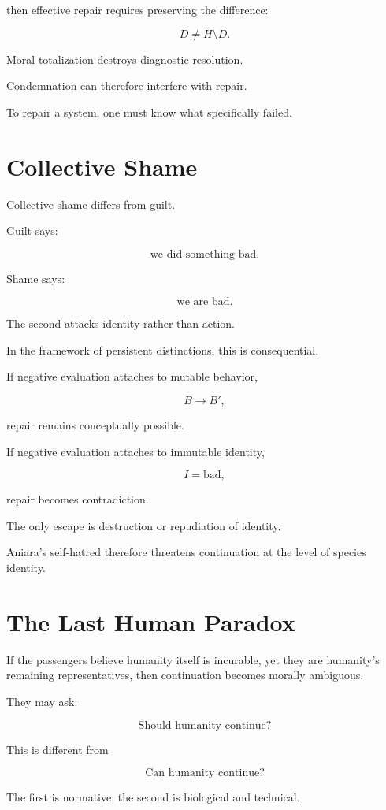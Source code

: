 \documentclass[11pt,oneside]{book}
\theoremstyle{definition}
\theoremstyle{remark}
\begin{document}
then effective repair requires preserving the difference:

\[
D\neq H\setminus D.
\]

Moral totalization destroys diagnostic resolution.

Condemnation can therefore interfere with repair.

To repair a system, one must know what specifically failed.

\section{Collective Shame}

Collective shame differs from guilt.

Guilt says:

\[
\text{we did something bad}.
\]

Shame says:

\[
\text{we are bad}.
\]

The second attacks identity rather than action.

In the framework of persistent distinctions, this is consequential.

If negative evaluation attaches to mutable behavior,

\[
B\rightarrow B',
\]

repair remains conceptually possible.

If negative evaluation attaches to immutable identity,

\[
I=\text{bad},
\]

repair becomes contradiction.

The only escape is destruction or repudiation of identity.

Aniara's self-hatred therefore threatens continuation at the level of species identity.

\section{The Last Human Paradox}

If the passengers believe humanity itself is incurable, yet they are humanity's remaining representatives, then continuation becomes morally ambiguous.

They may ask:

\[
\text{Should humanity continue?}
\]

This is different from

\[
\text{Can humanity continue?}
\]

The first is normative; the second is biological and technical.
\end{document}
